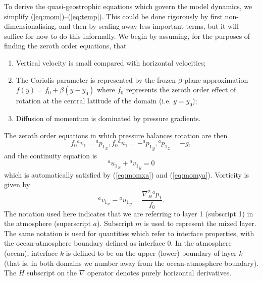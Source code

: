 \documentclass[11pt, a4paper,twoside]{article}
\newcommand{\p}[2]{{{}^{#1}p_{#2}}}
\newcommand{\uu}[2]{{{}^{#1}u_{#2}}}
\newcommand{\vv}[2]{{{}^{#1}v_{#2}}}
\numberwithin{equation}{section}
\begin{document}
To derive the quasi-geostrophic equations which govern the model dynamics, we simplify (\ref{eq:mom})--(\ref{eq:temp}).
This could be done rigorously by first non-dimensionalising, and then by scaling away less important terms, but it will suffice for now to do this informally.
We begin by assuming, for the purposes of finding the zeroth order equations, that
\begin{enumerate}
\item Vertical velocity is small compared with horizontal velocities;
\item The Coriolis parameter is represented by the frozen $\beta$-plane approximation $f(y)=f_0 + \beta (y - y_0)$ where $f_0$ represents the zeroth order effect of rotation at the central latitude of the domain (i.e. $y = y_0$);
\item Diffusion of momentum is dominated by pressure gradients.
\end{enumerate}
The zeroth order equations in which pressure balances rotation are then
\begin{subequations}
\begin{equation}\label{eq:momxa}
f_0 \vv{a}{1} = \p{a}{1}_x,
\end{equation}
\begin{equation}\label{eq:momya}
f_0 \uu{a}{1}= -\p{a}{1}_y,
\end{equation}
\begin{equation}\label{eq:momza}
\p{a}{1}_z = - g,
\end{equation}
\end{subequations}
and the continuity equation is
\begin{equation}\label{eq:conta}
\uu{a}{1}_x + \vv{a}{1}_y = 0
\end{equation}
which is automatically satisfied by (\ref{eq:momxa}) and (\ref{eq:momya}).
Vorticity is given by
\begin{equation}\label{eq:vort}
\vv{a}{1}_x - \uu{a}{1}_y = \frac{\nabla_H^2 \p{a}{1}}{f_0}.
\end{equation}The notation used here indicates that we are referring to layer 1 (subscript 1) in the atmosphere (superscript $a$).
Subscript $m$ is used to represent the mixed layer.
The same notation is used for quantities which refer to interface properties, with the ocean-atmosphere boundary defined as interface 0.
In the atmosphere (ocean), interface $k$ is defined to be on the upper (lower) boundary of layer $k$ (that is, in both domains we number away from the ocean-atmosphere boundary).
The $H$ subscript on the $\nabla$ operator denotes purely horizontal derivatives.
\end{document}
